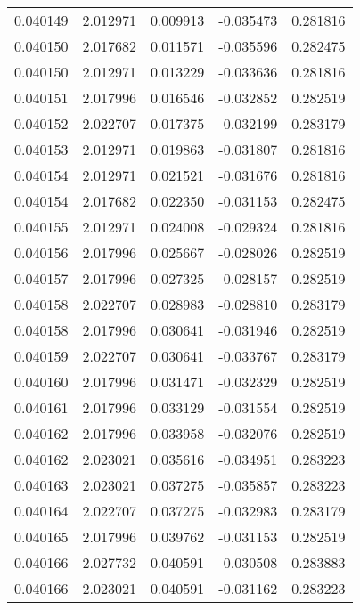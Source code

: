 \begin{tabular}{lrrrr}
0.040149    &  2.012971 &  0.009913 & -0.035473 &             0.281816 \\
0.040150    &  2.017682 &  0.011571 & -0.035596 &             0.282475 \\
0.040150    &  2.012971 &  0.013229 & -0.033636 &             0.281816 \\
0.040151    &  2.017996 &  0.016546 & -0.032852 &             0.282519 \\
0.040152    &  2.022707 &  0.017375 & -0.032199 &             0.283179 \\
0.040153    &  2.012971 &  0.019863 & -0.031807 &             0.281816 \\
0.040154    &  2.012971 &  0.021521 & -0.031676 &             0.281816 \\
0.040154    &  2.017682 &  0.022350 & -0.031153 &             0.282475 \\
0.040155    &  2.012971 &  0.024008 & -0.029324 &             0.281816 \\
0.040156    &  2.017996 &  0.025667 & -0.028026 &             0.282519 \\
0.040157    &  2.017996 &  0.027325 & -0.028157 &             0.282519 \\
0.040158    &  2.022707 &  0.028983 & -0.028810 &             0.283179 \\
0.040158    &  2.017996 &  0.030641 & -0.031946 &             0.282519 \\
0.040159    &  2.022707 &  0.030641 & -0.033767 &             0.283179 \\
0.040160    &  2.017996 &  0.031471 & -0.032329 &             0.282519 \\
0.040161    &  2.017996 &  0.033129 & -0.031554 &             0.282519 \\
0.040162    &  2.017996 &  0.033958 & -0.032076 &             0.282519 \\
0.040162    &  2.023021 &  0.035616 & -0.034951 &             0.283223 \\
0.040163    &  2.023021 &  0.037275 & -0.035857 &             0.283223 \\
0.040164    &  2.022707 &  0.037275 & -0.032983 &             0.283179 \\
0.040165    &  2.017996 &  0.039762 & -0.031153 &             0.282519 \\
0.040166    &  2.027732 &  0.040591 & -0.030508 &             0.283883 \\
0.040166    &  2.023021 &  0.040591 & -0.031162 &             0.283223 \\

\end{tabular}
